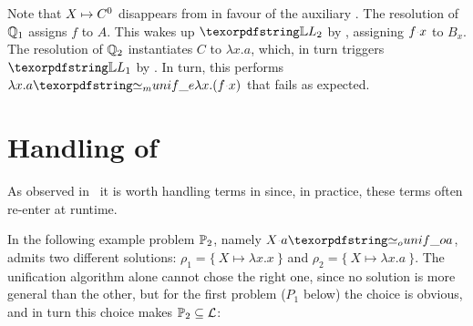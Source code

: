 \noindent
Note that $X \mapsto C^0$ disappears from \mapStore
in favour of the auxiliary \linketa {}.
The resolution of $\mathbb{Q}_1$ assigns $f$ to $A$. This wakes up
$\linkStore_2$ by \progressetaleft, assigning $f \appsep x$ to $B_x$.
The resolution of $\mathbb{Q}_2$ instantiates $C$ to $\lambda x.a$, which, in
turn triggers $\linkStore_1$ by \progressetaleft. In turn, this performs
$\lambda x.a \Ue \lambda x.(f \appsep x)$ that fails as expected.

\section{Handling of \notllambda}\label{sec:beta}

As observed in~\cite{teyjus} it is worth 
handling terms in \notllambda since, in practice, these terms often
re-enter \llambda at runtime.

In the following example problem $\mathbb{P}_2$, namely $X \appsep a \Uo a$,
admits two different solutions: $\rho_1 = \{~X \mapsto \lambda x.x~\}$
and $\rho_2 = \{~X \mapsto \lambda x.a~\}$.
The unification algorithm alone
cannot chose the right one, since no solution is more general than the other,
but for the first problem ($P_1$ below) the choice is obvious, and in turn
this choice makes $\mathbb{P}_2 \subseteq \mathcal{L}$:

